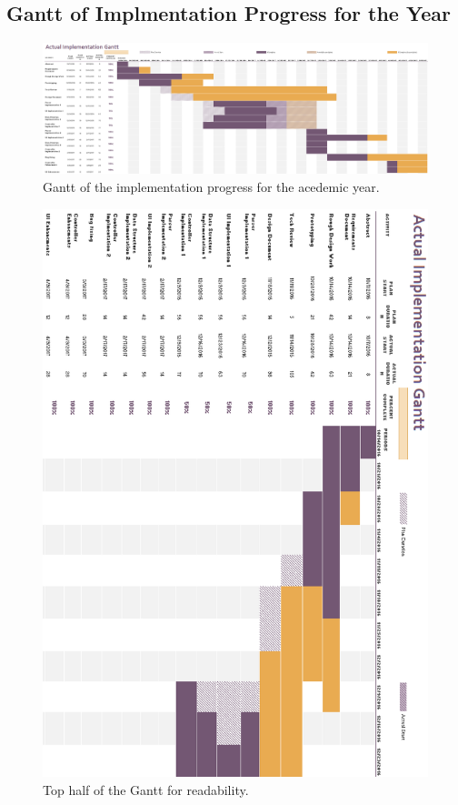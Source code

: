\documentclass[letterpaper,10pt,titlepage,draftclsnofoot,onecolumn,onesided] {IEEEtran}
\begin{document}
\subsection{Gantt of Implmentation Progress for the Year}
\begin{figure}[h]
	\centering
	\includegraphics[width=.75\textwidth]{Gantt}
	\caption{Gantt of the implementation progress for the acedemic year.}
\end{figure}
\begin{figure}[h]
	\centering
	\includegraphics[width=.75\textwidth]{GanttTop}
	\caption{Top half of the Gantt for readability.}
\end{figure}
\end{document}
